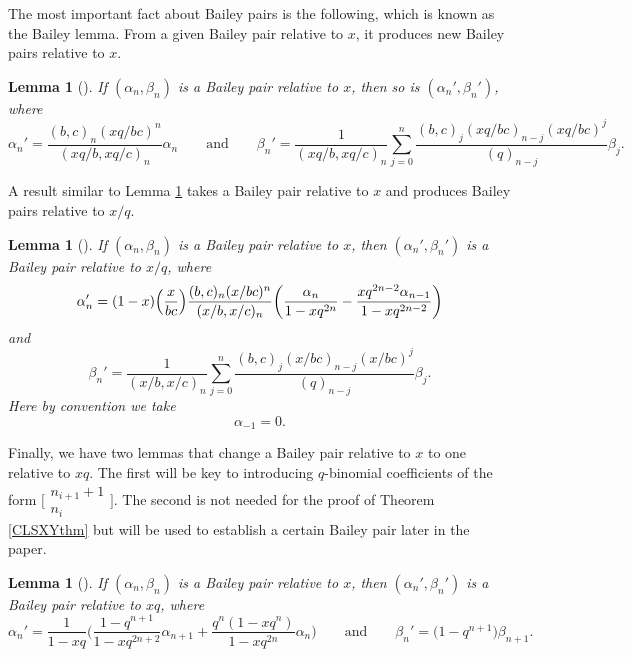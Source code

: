 \documentclass[pdftex]{sigma}
\newtheorem{Lemma}[Theorem]{Lemma}
\numberwithin{equation}{section}
\begin{document}
The most important fact about Bailey pairs is the following, which is known as the Bailey lemma. From a given Bailey pair relative to $x$, it produces new Bailey pairs relative to $x$.

\begin{Lemma}[\cite{Andmultiple}] \label{Baileylemma}
	If $(\alpha_n,\beta_n)$ is a Bailey pair relative to $x$, then so is $(\alpha_n',\beta_n')$, where
	\begin{equation*} %
		\alpha_n' = \frac{(b,c)_n(xq/bc)^n}{(xq/b,xq/c)_n}\alpha_n
	\qquad
	\text{and}
	\qquad %
		\beta_n' = \frac{1}{(xq/b,xq/c)_n} \sum_{j=0}^n \frac{(b,c)_j(xq/bc)_{n-j} (xq/bc)^j}{(q)_{n-j}} \beta_j.
	\end{equation*}
\end{Lemma}

A result similar to Lemma \ref{Baileylemma} takes a Bailey pair relative to $x$ and produces Bailey pairs relative to $x/q$.
\begin{Lemma}[\cite{AABLattice}] \label{Baileylatticelemma}
	If $(\alpha_n,\beta_n)$ is a Bailey pair relative to $x$, then $(\alpha_n',\beta_n')$ is a Bailey pair relative to $x/q$, where
	\begin{equation*} %
		\alpha_n' = (1-x) \Bigl(\frac{x}{bc} \Bigr) \frac{(b,c)_n(x/bc)^n}{(x/b,x/c)_n}\biggl(\frac{\alpha_n}{1-xq^{2n}} - \frac{xq^{2n-2}\alpha_{n-1}}{1-xq^{2n-2}} \biggr)
	\end{equation*}
and
	\begin{equation*} %
		\beta_n' = \frac{1}{(x/b,x/c)_n} \sum_{j=0}^n \frac{(b,c)_j(x/bc)_{n-j} (x/bc)^j}{(q)_{n-j}} \beta_j.
	\end{equation*}
Here by convention we take
	\begin{equation} \label{eqn:latticeextracond}
		\alpha_{-1} = 0.
	\end{equation}
\end{Lemma}


Finally, we have two lemmas that change a Bailey pair relative to $x$ to one relative to $xq$. The first will be key to introducing $q$-binomial coefficients of the form $\bigl[\begin{smallmatrix} n_{i+1} + 1 \\ n_i \end{smallmatrix}\bigr]$. The second is not needed for the proof of Theorem \ref{CLSXYthm} but will be used to establish a certain Bailey pair later in the paper.
\begin{Lemma}[\cite{Lo1}] \label{littlelemma}
	If $(\alpha_n,\beta_n)$ is a Bailey pair relative to $x$, then $(\alpha_n',\beta_n')$ is a Bailey pair relative to $xq$, where
	\begin{equation*} %
		\alpha_n' = \frac{1}{1-xq} \biggl(\frac{1-q^{n+1}}{1-xq^{2n+2}} \alpha_{n+1} + \frac{q^n(1-xq^n)}{1-xq^{2n}} \alpha_n \biggr)
	\qquad
	\text{and}
	\qquad %
		\beta_n' = \bigl(1-q^{n+1}\bigr)\beta_{n+1}.
	\end{equation*}
\end{Lemma}
\end{document}
